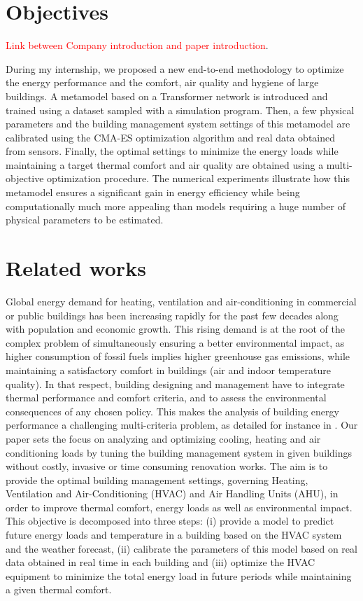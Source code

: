 \documentclass[12pt]{article}
\begin{document}
\section{Objectives}
\textcolor{red}{Link between Company introduction and paper introduction}.

During my internship, we proposed a new end-to-end methodology to optimize the energy performance and the comfort, air quality and hygiene of large buildings. A metamodel based on a Transformer network is introduced and trained using a dataset sampled with a simulation program. Then, a few physical parameters and the building management system settings of this metamodel are calibrated using the CMA-ES optimization algorithm and real data obtained from sensors. Finally, the optimal settings to minimize the energy loads while maintaining a target thermal comfort and air quality are obtained using a multi-objective optimization procedure. The numerical experiments illustrate how this metamodel ensures a significant gain in energy efficiency while being computationally much more appealing than models requiring a huge number of physical parameters to be estimated.

\section{Related works}
Global energy demand for heating, ventilation and air-conditioning  in commercial or public buildings has been increasing rapidly for the past few decades along with population and economic growth. This rising demand is at the root of the complex problem of simultaneously ensuring a better environmental impact, as higher consumption of fossil fuels implies higher greenhouse gas emissions, while maintaining a satisfactory comfort in buildings (air and indoor temperature quality). In that respect, building designing and management have to integrate thermal performance and comfort criteria, and to assess the environmental consequences of any chosen policy. This makes the analysis of building energy performance a challenging multi-criteria problem, as detailed for instance in \cite{Bre2016ResidentialBD}. Our paper sets the focus on analyzing and optimizing cooling, heating and air conditioning loads by tuning the building management system in given buildings without costly, invasive or time consuming renovation works. The aim is to provide the optimal building management settings, governing Heating, Ventilation and Air-Conditioning (HVAC) and Air Handling Units (AHU), in order to improve thermal comfort, energy loads as well as environmental impact. This objective is decomposed into three steps: (i) provide a model to predict future energy loads and temperature in a building based on the HVAC system and the weather forecast, (ii) calibrate the parameters of this model based on real data obtained in real time in each building and (iii) optimize the HVAC equipment to minimize the total energy load in future periods while maintaining a given thermal comfort.
\end{document}
